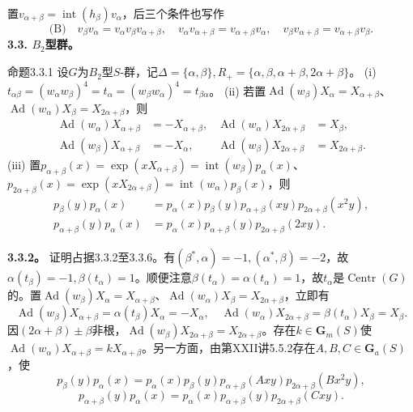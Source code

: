 置$v_{\alpha+\beta}=\operatorname{int}(h_\beta)v_\alpha$，后三个条件也写作
\[\text{(B)}\quad v_\beta v_\alpha=v_\alpha v_\beta v_{\alpha+\beta},\quad v_\alpha v_{\alpha+\beta}=v_{\alpha+\beta}v_\alpha,\quad v_\beta v_{\alpha+\beta}=v_{\alpha+\beta}v_\beta.\]
\textbf{3.3. $B_2$型群。}
\begin{SGAresult}{命题}{3.3.1}
设$G$为$B_2$型$S$-群，记$\Delta=\{\alpha,\beta\},R_+=\{\alpha,\beta,\alpha+\beta,2\alpha+\beta\}$。
(i) $t_{\alpha\beta}=(w_\alpha w_\beta)^4=t_\alpha=(w_\beta w_\alpha)^4=t_{\beta\alpha}$。
(ii) 若置$\operatorname{Ad}(w_\beta)X_\alpha=X_{\alpha+\beta}$、$\operatorname{Ad}(w_\alpha)X_\beta=X_{2\alpha+\beta}$，则
\[\begin{aligned}\operatorname{Ad}(w_\alpha)X_{\alpha+\beta}&=-X_{\alpha+\beta},&\operatorname{Ad}(w_\alpha)X_{2\alpha+\beta}&=X_\beta,\\\operatorname{Ad}(w_\beta)X_{\alpha+\beta}&=-X_\alpha,&\operatorname{Ad}(w_\beta)X_{2\alpha+\beta}&=X_{2\alpha+\beta}.\end{aligned}\]
(iii) 置$p_{\alpha+\beta}(x)=\exp(xX_{\alpha+\beta})=\operatorname{int}(w_\beta)p_\alpha(x)$、$p_{2\alpha+\beta}(x)=\exp(xX_{2\alpha+\beta})=\operatorname{int}(w_\alpha)p_\beta(x)$，则
\[\begin{aligned}p_\beta(y)p_\alpha(x)&=p_\alpha(x)p_\beta(y)p_{\alpha+\beta}(xy)p_{2\alpha+\beta}(x^2y),\\p_{\alpha+\beta}(y)p_\alpha(x)&=p_\alpha(x)p_{\alpha+\beta}(y)p_{2\alpha+\beta}(2xy).\end{aligned}\]
\end{SGAresult}
\textbf{3.3.2。} 证明占据3.3.2至3.3.6。有$(\beta^*,\alpha)=-1,(\alpha^*,\beta)=-2$，故$\alpha(t_\beta)=-1,\beta(t_\alpha)=1$。顺便注意$\beta(t_\alpha)=\alpha(t_\alpha)=1$，故$t_\alpha$是$\operatorname{Centr}(G)$的。置$\operatorname{Ad}(w_\beta)X_\alpha=X_{\alpha+\beta}$、$\operatorname{Ad}(w_\alpha)X_\beta=X_{2\alpha+\beta}$，立即有
\[\operatorname{Ad}(w_\beta)X_{\alpha+\beta}=\alpha(t_\beta)X_\alpha=-X_\alpha,\quad\operatorname{Ad}(w_\alpha)X_{2\alpha+\beta}=\beta(t_\alpha)X_\beta=X_\beta.\]
因$(2\alpha+\beta)\pm\beta$非根，$\operatorname{Ad}(w_\beta)X_{2\alpha+\beta}=X_{2\alpha+\beta}$。存在$k\in\mathbf G_m(S)$使$\operatorname{Ad}(w_\alpha)X_{\alpha+\beta}=kX_{\alpha+\beta}$。另一方面，由第XXII讲5.5.2存在$A,B,C\in\mathbf G_a(S)$，使
\[p_\beta(y)p_\alpha(x)=p_\alpha(x)p_\beta(y)p_{\alpha+\beta}(Axy)p_{2\alpha+\beta}(Bx^2y),\tag{1}\]
\[p_{\alpha+\beta}(y)p_\alpha(x)=p_\alpha(x)p_{\alpha+\beta}(y)p_{2\alpha+\beta}(Cxy).\tag{2}\]

